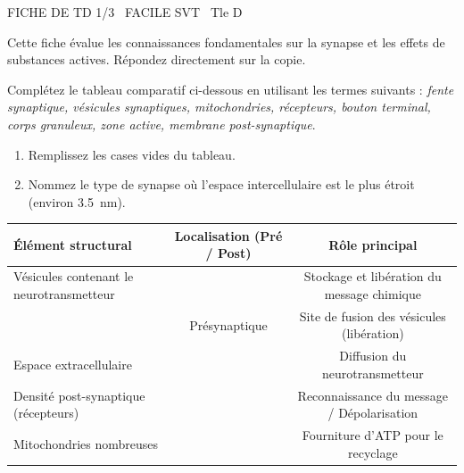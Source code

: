 \documentclass[11pt]{article}
\begin{document}
\begin{tcolorbox}[enhanced,colback=popink,colframe=popink,arc=10pt,boxrule=0pt,left=12pt,right=12pt,top=9pt,bottom=9pt]
{\color{white}\popxbold\small FICHE DE TD 1/3 \textbullet\ FACILE \hfill SVT \textbullet\ Tle D\par}
\end{tcolorbox}
\vspace{4pt}
Cette fiche évalue les connaissances fondamentales sur la synapse et les effets de substances actives. Répondez directement sur la copie.

\begin{exercice}
Complétez le tableau comparatif ci-dessous en utilisant les termes suivants : \textit{fente synaptique, vésicules synaptiques, mitochondries, récepteurs, bouton terminal, corps granuleux, zone active, membrane post-synaptique}.
\begin{enumerate}
    \item Remplissez les cases vides du tableau.
    \item Nommez le type de synapse où l'espace intercellulaire est le plus étroit (environ \SI{3,5}{\nano\meter}).
\end{enumerate}
\begin{tabularx}{\linewidth}{|X|c|c|}
\hline
\textbf{Élément structural} & \textbf{Localisation (Pré / Post)} & \textbf{Rôle principal} \\
\hline
Vésicules contenant le neurotransmetteur &  & Stockage et libération du message chimique \\
\hline
 & Présynaptique & Site de fusion des vésicules (libération) \\
\hline
Espace extracellulaire &  & Diffusion du neurotransmetteur \\
\hline
Densité post-synaptique (récepteurs) &  & Reconnaissance du message / Dépolarisation \\
\hline
Mitochondries nombreuses &  & Fourniture d'ATP pour le recyclage \\
\hline
\end{tabularx}
\end{exercice}
\end{document}
